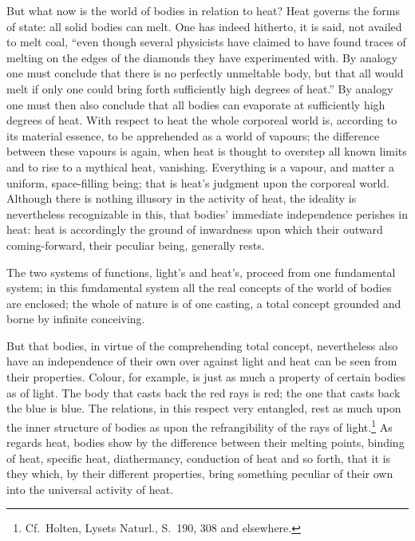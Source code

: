 \documentclass[12pt,a4paper]{book}
\begin{document}
But what now is the world of bodies in relation to heat?
Heat governs the forms of state: all solid bodies can melt. One has indeed hitherto, it is said, not
availed to melt coal, ``even though several physicists have claimed to have found traces of melting on the edges of the
diamonds they have experimented with. By analogy one must conclude that there is no perfectly unmeltable body, but that
all would melt if only one could bring forth sufficiently high degrees of heat.'' By analogy one must then also conclude
that all bodies can evaporate at sufficiently high degrees of heat. With respect to heat the whole corporeal world is,
according to its material essence, to be apprehended as a world of vapours; the difference between these vapours is
again, when heat is thought to overstep all known limits and to rise to a mythical heat, vanishing. Everything is a
vapour, and matter a uniform, space-filling being; that is heat's judgment upon the corporeal world. Although there is
nothing illusory in the activity of heat, the ideality is nevertheless recognizable in this, that bodies' immediate
independence perishes in heat: heat is accordingly the ground of inwardness upon which their outward coming-forward,
their peculiar being, generally rests.

The two systems of functions, light's and heat's, proceed from one fundamental system; in this fundamental system all the
real concepts of the world of bodies are enclosed; the whole of nature is of one casting, a total concept grounded and
borne by infinite conceiving.

But that bodies, in virtue of the comprehending total concept, nevertheless also have an independence of their own over
against light and heat can be seen from their properties. Colour, for example, is just as much a property of certain
bodies as of light. The body that casts back the red rays is red; the one that casts back the blue is blue. The relations,
in this respect very entangled, rest as much upon the
inner structure of bodies as upon the refrangibility of the rays of light.\footnote{Cf.\ Holten, Lysets Naturl., S.\ 190,
308 and elsewhere.} As regards heat, bodies show by the difference between their melting points, binding of heat,
specific heat, diathermancy, conduction of heat and so forth, that it is they which, by their different properties, bring
something peculiar of their own into the universal activity of heat.
\end{document}
